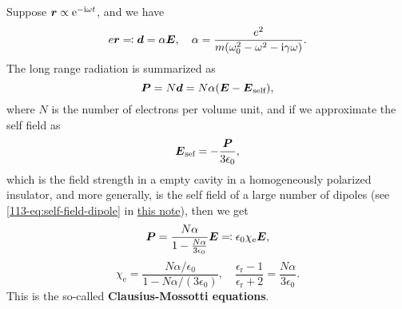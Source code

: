 \documentclass[hyperref, a4paper]{article}
\newcommand*{\ii}{\mathrm{i}}
\newcommand*{\ee}{\mathrm{e}}
\newcommand*{\concept}[1]{{\textbf{#1}}}
\begin{document}
Suppose $\vb*{r} \propto \ee^{- \ii \omega t}$, and we have 
\begin{equation}
    e\vb*{r} \eqqcolon \vb*{d} = \alpha \vb*{E}, \quad \alpha = \frac{e^2}{m (\omega_0^2 - \omega^2 - \ii \gamma \omega)}.
    \label{eq:alpha-oscillators}
\end{equation}
The long range radiation is summarized as 
\begin{equation}
    \vb*{P} = N \vb*{d} = N \alpha (\vb*{E} - \vb*{E}_\text{self}),
\end{equation}
where $N$ is the number of electrons per volume unit, and if we approximate the self field as 
\begin{equation}
    \vb*{E}_\text{sef} = - \frac{\vb*{P}}{3 \epsilon_0},
\end{equation}
which is the field strength in a empty cavity in a homogeneously polarized insulator, and more generally, is the 
self field of a large number of dipoles (see \eqref{113-eq:self-field-dipole} in 
\href{lecture-11-3.pdf}{this note}), then we get 
\begin{equation}
    \vb*{P} = \frac{N \alpha}{1 - \frac{N \alpha}{3 \epsilon_0}} \vb*{E} \eqqcolon \epsilon_0 \chi_\text{e} \vb*{E},
\end{equation}
\begin{equation}
    \chi_\text{e} = \frac{N \alpha / \epsilon_0}{1 - N \alpha / (3 \epsilon_0)}, \quad \frac{\epsilon_\text{r} - 1}{\epsilon_\text{r} + 2} = \frac{N \alpha}{3 \epsilon_0}.
    \label{eq:clausius-mossotti}
\end{equation}
This is the so-called \concept{Clausius-Mossotti equations}.
\end{document}

